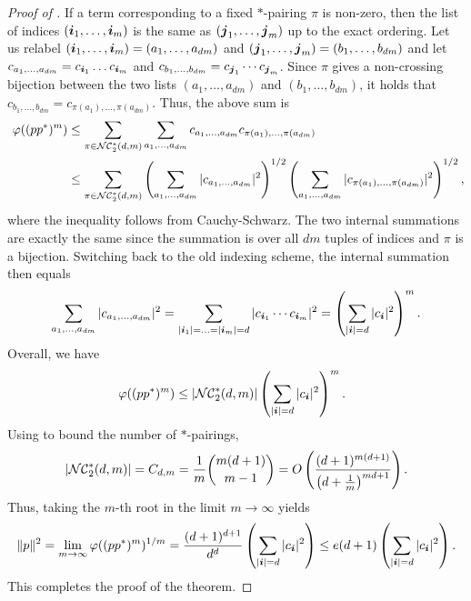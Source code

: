 \begin{proof}[Proof of ]
    If a term corresponding to a fixed $*$-pairing $\pi$ is non-zero, then the list of indices $({\boldsymbol{i}}_1, \ldots, {\boldsymbol{i}}_m)$ is the same as $({\boldsymbol{j}}_1, \ldots, {\boldsymbol{j}}_m)$ up to the exact ordering. Let us relabel $({\boldsymbol{i}}_1, \ldots, {\boldsymbol{i}}_m) = (a_1, \ldots, a_{dm})$ and $({\boldsymbol{j}}_1, \ldots, {\boldsymbol{j}}_m) = (b_1, \ldots, b_{dm})$ and let $c_{a_1, \ldots, a_{dm}} = c_{{\boldsymbol{i}}_1}\ldots c_{{\boldsymbol{i}}_m}$ and $c_{b_1, \ldots, b_{dm}} = c_{{\boldsymbol{j}}_1}\cdots c_{{\boldsymbol{j}}_m}$. Since $\pi$ gives a non-crossing bijection between the two lists $(a_1, \ldots, a_{dm})$ and $(b_1,\ldots, b_{dm})$, it holds that $c_{b_1, \ldots, b_{dm}} = c_{\pi(a_1),\ldots, \pi(a_{dm})}$. Thus, the above sum is
    \begin{align*}
        \ \varphi((pp^*)^m) &\le \sum_{\pi \in \mathcal{NC}^*_2(d,m)}  \sum_{a_1, \ldots, a_{dm}} c_{a_1, \ldots, a_{dm}} c_{\pi(a_1),\ldots, \pi(a_{dm})}\\
        \ &\le \sum_{\pi \in \mathcal{NC}^*_2(d,m)} \left(\sum_{a_1, \ldots, a_{dm}} |c_{a_1, \ldots, a_{dm}}|^2\right)^{1/2}
        \left(\sum_{a_1,\ldots, a_{dm}} |c_{\pi(a_1),\ldots, \pi(a_{dm})}|^2\right)^{1/2},
    \end{align*}    
     where the inequality follows from Cauchy-Schwarz. The two internal summations are exactly the same since the summation is over all $dm$ tuples of indices and $\pi$ is a bijection. Switching back to the old indexing scheme, the internal summation then equals 
     \[  \sum_{a_1, \ldots, a_{dm}} |c_{a_1, \ldots, a_{dm}}|^2 = \sum_{\substack{|{\boldsymbol{i}}_1|=\ldots=|{\boldsymbol{i}}_m|=d}} |c_{{\boldsymbol{i}}_1}\cdots c_{{\boldsymbol{i}}_m}|^2 = \left(\sum_{|{\boldsymbol{i}}|=d} |c_{{\boldsymbol{i}}}|^2\right)^m.\] 
    Overall, we have
     \begin{align*}   
        \  \varphi((pp^*)^m) &\le |\mathcal{NC}^*_2(d,m)|\left(\sum_{|{\boldsymbol{i}}|=d} |c_{{\boldsymbol{i}}}|^2\right)^m.
    \end{align*}
    Using  to bound the number of $*$-pairings,
    \[ |\mathcal{NC}^*_2(d,m)| = C_{d,m} = \frac{1}{m}\binom{m(d+1)}{m-1} = O\left(\frac{(d+1)^{m(d+1)}}{\left(d+\frac1m\right)^{md+1}}\right).\]
    Thus, taking the $m$-th root in the limit $m \to \infty$ yields
    \[ \|p\|^2 = \lim_{m \to \infty}  \varphi((pp^*)^m)^{1/m} = \frac{(d+1)^{d+1}}{d^d}\left(\sum_{|{\boldsymbol{i}}|=d} |c_{{\boldsymbol{i}}}|^2\right) \le e(d+1) \left(\sum_{|{\boldsymbol{i}}|=d} |c_{{\boldsymbol{i}}}|^2\right).\]
    This completes the proof of the theorem.
\end{proof}

